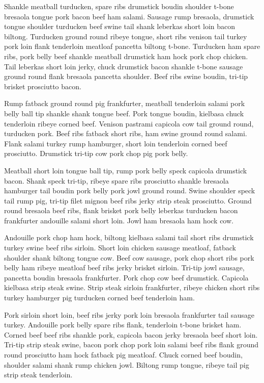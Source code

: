 Shankle meatball turducken, spare ribs drumstick boudin shoulder t-bone bresaola tongue pork bacon beef ham salami. Sausage rump bresaola, drumstick tongue shoulder turducken beef swine tail shank leberkas short loin bacon biltong. Turducken ground round ribeye tongue, short ribs venison tail turkey pork loin flank tenderloin meatloaf pancetta biltong t-bone. Turducken ham spare ribs, pork belly beef shankle meatball drumstick ham hock pork chop chicken. Tail leberkas short loin jerky, chuck drumstick bacon shankle t-bone sausage ground round flank bresaola pancetta shoulder. Beef ribs swine boudin, tri-tip brisket prosciutto bacon.

Rump fatback ground round pig frankfurter, meatball tenderloin salami pork belly ball tip shankle shank tongue beef. Pork tongue boudin, kielbasa chuck tenderloin ribeye corned beef. Venison pastrami capicola cow tail ground round, turducken pork. Beef ribs fatback short ribs, ham swine ground round salami. Flank salami turkey rump hamburger, short loin tenderloin corned beef prosciutto. Drumstick tri-tip cow pork chop pig pork belly.

Meatball short loin tongue ball tip, rump pork belly speck capicola drumstick bacon. Shank speck tri-tip, ribeye spare ribs prosciutto shankle bresaola hamburger tail boudin pork belly pork jowl ground round. Swine shoulder speck tail rump pig, tri-tip filet mignon beef ribs jerky strip steak prosciutto. Ground round bresaola beef ribs, flank brisket pork belly leberkas turducken bacon frankfurter andouille salami short loin. Jowl ham bresaola ham hock cow.

Andouille pork chop ham hock, biltong kielbasa salami tail short ribs drumstick turkey swine beef ribs sirloin. Short loin chicken sausage meatloaf, fatback shoulder shank biltong tongue cow. Beef cow sausage, pork chop short ribs pork belly ham ribeye meatloaf beef ribs jerky brisket sirloin. Tri-tip jowl sausage, pancetta boudin bresaola frankfurter. Pork chop cow beef drumstick. Capicola kielbasa strip steak swine. Strip steak sirloin frankfurter, ribeye chicken short ribs turkey hamburger pig turducken corned beef tenderloin ham.

Pork sirloin short loin, beef ribs jerky pork loin bresaola frankfurter tail sausage turkey. Andouille pork belly spare ribs flank, tenderloin t-bone brisket ham. Corned beef beef ribs shankle pork, capicola bacon jerky bresaola beef short loin. Tri-tip strip steak swine, bacon pork chop pork loin salami beef ribs flank ground round prosciutto ham hock fatback pig meatloaf. Chuck corned beef boudin, shoulder salami shank rump chicken jowl. Biltong rump tongue, ribeye tail pig strip steak tenderloin.

